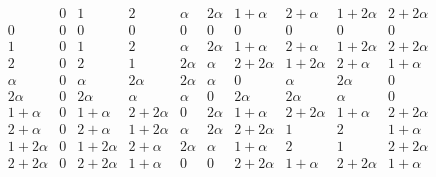 \documentclass{amsart}
\begin{document}
\[
\begin{array}{c|ccccccccc}
          &
0         &
1         &
2         & 
\alpha    &
2\alpha   &
1+\alpha  &
2+\alpha  &
1+2\alpha &
2+2\alpha \\
\hline
0         & 0 & 0 & 0 & 0 & 0 & 0 & 0 & 0 & 0 
\\
1         &
0         &
1         &
2         & 
\alpha    &
2\alpha   &
1+\alpha  &
2+\alpha  &
1+2\alpha &
2+2\alpha \\
2         &
0         &
2         &
1         & 
2\alpha    &
\alpha   &
2+2\alpha  &
1+2\alpha  &
2+\alpha &
1+\alpha 
\\
\alpha    &
0         &
\alpha    &
2\alpha   & 
2\alpha   &
 \alpha   &
0  &
\alpha  &
2\alpha &
0 \\
2\alpha   &
0         &
2\alpha   &
\alpha    & 
\alpha    &  
0         &
2\alpha   &
2\alpha   &
\alpha    &
0 \\
1+\alpha   &
0          &
1+\alpha   &
2+2\alpha  & 
0          &  
2\alpha    &
1+\alpha   &
2+2\alpha  &
1+\alpha   &
2+2\alpha \\
2+\alpha   &
0          &
2+\alpha   &
1+2\alpha  & 
\alpha          &  
2\alpha    &
2+2\alpha   &
1  &
2   &
1+\alpha \\
1+2\alpha   &
0          &
1+2\alpha   &
2+\alpha  & 
2\alpha         &  
\alpha  &
1+\alpha   &
2 &
1  &
2+2\alpha \\
2+2\alpha   &
0          &
2+2\alpha   &
1+\alpha  & 
0          &  
0    &
2+2\alpha   &
1+\alpha  &
2+2\alpha   &
1+\alpha   \\
\end{array}
\]
\end{document}
